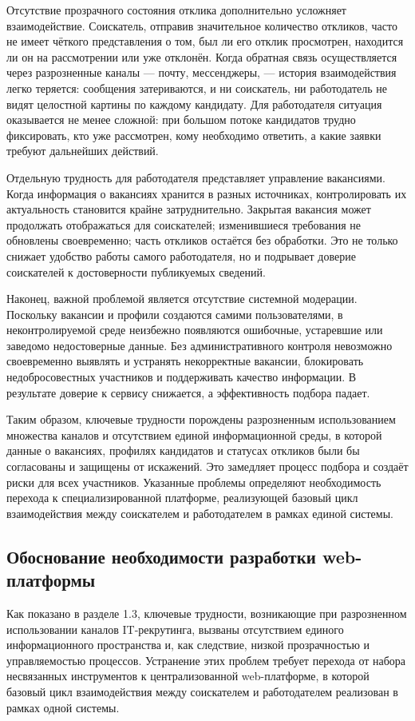 Отсутствие прозрачного состояния отклика дополнительно усложняет взаимодействие. Соискатель, отправив значительное количество откликов, часто не имеет чёткого представления о том, был ли его отклик просмотрен, находится ли он на рассмотрении или уже отклонён. Когда обратная связь осуществляется через разрозненные каналы --- почту, мессенджеры, --- история взаимодействия легко теряется: сообщения затериваются, и ни соискатель, ни работодатель не видят целостной картины по каждому кандидату. Для работодателя ситуация оказывается не менее сложной: при большом потоке кандидатов трудно фиксировать, кто уже рассмотрен, кому необходимо ответить, а какие заявки требуют дальнейших действий.

Отдельную трудность для работодателя представляет управление вакансиями. Когда информация о вакансиях хранится в разных источниках, контролировать их актуальность становится крайне затруднительно. Закрытая вакансия может продолжать отображаться для соискателей; изменившиеся требования не обновлены своевременно; часть откликов остаётся без обработки. Это не только снижает удобство работы самого работодателя, но и подрывает доверие соискателей к достоверности публикуемых сведений.

Наконец, важной проблемой является отсутствие системной модерации. Поскольку вакансии и профили создаются самими пользователями, в неконтролируемой среде неизбежно появляются ошибочные, устаревшие или заведомо недостоверные данные. Без административного контроля невозможно своевременно выявлять и устранять некорректные вакансии, блокировать недобросовестных участников и поддерживать качество информации. В результате доверие к сервису снижается, а эффективность подбора падает.

Таким образом, ключевые трудности порождены разрозненным использованием множества каналов и отсутствием единой информационной среды, в которой данные о вакансиях, профилях кандидатов и статусах откликов были бы согласованы и защищены от искажений. Это замедляет процесс подбора и создаёт риски для всех участников. Указанные проблемы определяют необходимость перехода к специализированной платформе, реализующей базовый цикл взаимодействия между соискателем и работодателем в рамках единой системы.

\subsection{Обоснование необходимости разработки web-платформы}

Как показано в разделе 1.3, ключевые трудности, возникающие при разрозненном использовании каналов IT-рекрутинга, вызваны отсутствием единого информационного пространства и, как следствие, низкой прозрачностью и управляемостью процессов. Устранение этих проблем требует перехода от набора несвязанных инструментов к централизованной web-платформе, в которой базовый цикл взаимодействия между соискателем и работодателем реализован в рамках одной системы.

